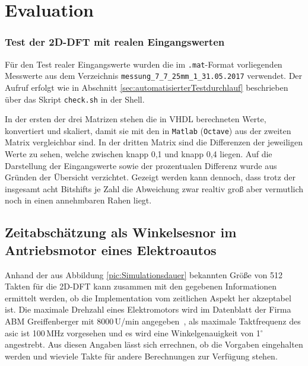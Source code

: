 



  
 \chapter{Evaluation}
 





 \subsection{Test der 2D-DFT mit realen Eingangswerten}
 
 Für den Test realer Eingangswerte wurden die im \texttt{.mat}-Format vorliegenden Messwerte aus dem Verzeichnis \texttt{messung\_7\_7\_25mm\_1\_31.05.2017} verwendet.
 Der Aufruf erfolgt wie in Abschnitt \ref{sec:automatisierterTestdurchlauf} beschrieben über das Skript \texttt{check.sh} in der Shell.
 
 
 

In der ersten der drei Matrizen stehen die in VHDL berechneten Werte, konvertiert und skaliert, damit sie mit den in \texttt{Matlab} (\texttt{Octave}) aus der zweiten 
Matrix vergleichbar sind. In der dritten Matrix sind die Differenzen der jeweiligen Werte zu sehen, welche zwischen knapp 0,1 und knapp 0,4 liegen. 
Auf die Darstellung der Eingangswerte sowie der prozentualen Differenz wurde aus Gründen der Übersicht verzichtet. 
Gezeigt werden kann dennoch, dass trotz der insgesamt acht Bitshifts je Zahl die Abweichung zwar realtiv groß aber vermutlich noch in einen annehmbaren Rahen liegt.
 
 
 \section{Zeitabschätzung als Winkelsesnor im Antriebsmotor eines Elektroautos}
 Anhand der aus Abbildung \ref{pic:Simulationsdauer} bekannten Größe von 512 Takten für die 2D-DFT kann zusammen mit den gegebenen Informationen
 ermittelt werden, ob die Implementation vom zeitlichen 
 Aspekt her akzeptabel ist.
 Die maximale Drehzahl eines Elektromotors wird im Datenblatt der Firma ABM Greiffenberger mit 8000\,U/min angegeben~\autocite[5]{greiffenberger},
 als maximale Taktfrequenz des \gls{asic} ist 100\,MHz vorgesehen und es wird eine Winkelgenauigkeit von 1${}^\circ$ angestrebt.
 Aus diesen Angaben lässt sich errechnen, ob die Vorgaben eingehalten werden und wieviele Takte für andere Berechnungen zur Verfügung stehen.
 
